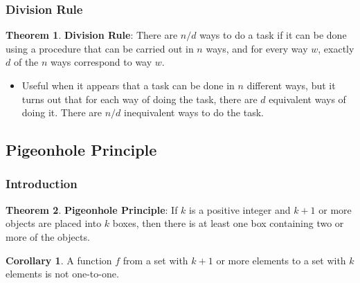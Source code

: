 \documentclass[article, 11pt]{article}
\theoremstyle{definition}
\newtheorem{theorem}{Theorem}[subsubsection]
\newtheorem{corollary}{Corollary}[subsubsection]
\begin{document}
    \subsubsection{Division Rule}
    \begin{theorem}
        \textbf{Division Rule}: There are $n/d$ ways to do a task if it can be done using a procedure that can be carried out in $n$ ways, and for every way $w$, exactly $d$ of the $n$ ways correspond to way $w$.
        \begin{itemize}
            \item Useful when it appears that a task can be done in $n$ different ways, but it turns out that for each way of doing the task, there are $d$ equivalent ways of doing it. There are $n/d$ inequivalent ways to do the task.
        \end{itemize}
    \end{theorem}
    \subsection{Pigeonhole Principle}
    \subsubsection{Introduction}
    \begin{theorem}
        \textbf{Pigeonhole Principle}: If $k$ is a positive integer and $k+1$ or more objects are placed into $k$ boxes, then there is at least one box containing two or more of the objects.
    \end{theorem}
    \begin{corollary}
        A function $f$ from a set with $k+1$ or more elements to a set with $k$ elements is not one-to-one.
    \end{corollary}
\end{document}
